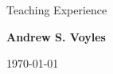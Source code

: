 \documentclass{resume2} %
\newif\iffull
\newif\ifday
\begin{document}


\fulltrue

\begin{center}
{\Large Teaching Experience}

{\large \textbf{Andrew S. Voyles}}

\today
\end{center} 



\end{document}

